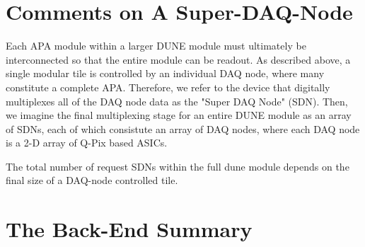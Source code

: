 \section{Comments on A Super-DAQ-Node}

Each APA module within a larger DUNE module must ultimately be interconnected so that the entire module can be readout.
As described above, a single modular tile is controlled by an individual DAQ node, where many constitute a complete APA.
Therefore, we refer to the device that digitally multiplexes all of the DAQ node data as the "Super DAQ Node" (SDN).
Then, we imagine the final multiplexing stage for an entire DUNE module as an array of SDNs, each of which consistute an array of DAQ nodes, where each DAQ node is a 2-D array of Q-Pix based ASICs.

The total number of request SDNs within the full dune module depends on the final size of a DAQ-node controlled tile.

\section{The Back-End Summary}
